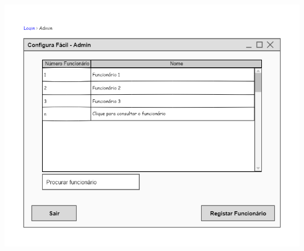 \documentclass[11pt]{article} %
\begin{document}
\begin{center}
 	\includegraphics[width = 5.5in]{configura_fcil_admin.png}
\end{center}
\end{document}
